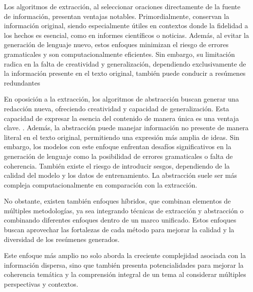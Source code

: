     Los algoritmos de extracción, al seleccionar oraciones directamente de la fuente de información, presentan ventajas notables. Primordialmente, conservan la información original, siendo especialmente útiles en contextos donde la fidelidad a los hechos es esencial, como en informes científicos o noticias. Además, al evitar la generación de lenguaje nuevo, estos enfoques minimizan el riesgo de errores gramaticales y son computacionalmente eficientes. Sin embargo, su limitación radica en la falta de creatividad y generalización, dependiendo exclusivamente de la información presente en el texto original, también puede conducir a resúmenes redundantes \cite{LexRank}

    En oposición a la extracción, los algoritmos de abstracción buscan generar una redacción nueva, ofreciendo creatividad y capacidad de generalización. Esta capacidad de expresar la esencia del contenido de manera única es una ventaja clave. \cite{rush2015neural}. Además, la abstracción puede manejar información no presente de manera literal en el texto original, permitiendo una expresión más amplia de ideas\cite{PaulusXS17}. Sin embargo, los modelos con este enfoque enfrentan desafíos significativos en la generación de lenguaje como la posibilidad de errores gramaticales o falta de coherencia. También existe el riesgo de introducir sesgos, dependiendo de la calidad del modelo y los datos de entrenamiento. La abstracción suele ser más compleja computacionalmente en comparación con la extracción.

    No obstante, existen también enfoques híbridos\cite{SeeLM17}, que combinan elementos de múltiples metodologías, ya sea integrando técnicas de extracción y abstracción o combinando diferentes enfoques dentro de un marco unificado. Estos enfoques buscan aprovechar las fortalezas de cada método para mejorar la calidad y la diversidad de los resúmenes generados.

    Este enfoque más amplio no solo aborda la creciente complejidad asociada con la información dispersa, sino que también presenta potencialidades para mejorar la coherencia temática y la comprensión integral de un tema al considerar múltiples perspectivas y contextos.

